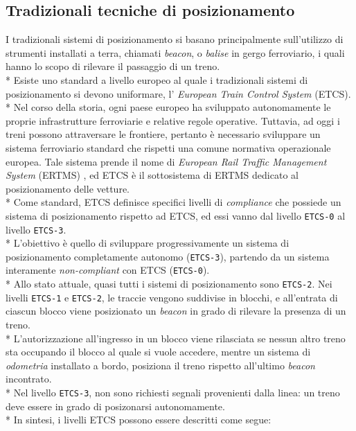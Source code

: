 \subsection{Tradizionali tecniche di posizionamento}
I tradizionali sistemi di posizionamento si basano principalmente sull'utilizzo di strumenti installati a terra, chiamati \emph{beacon}, o \emph{balise} in gergo ferroviario, i quali hanno lo scopo di rilevare il passaggio di un treno. \cite{tecnicheodierne}\\*
Esiste uno standard a livello europeo al quale i tradizionali sistemi di posizionamento si devono uniformare, l' \emph{European Train Control System} (ETCS).\\*
Nel corso della storia, ogni paese europeo ha sviluppato autonomamente le proprie infrastrutture ferroviarie e relative regole operative. Tuttavia, ad oggi i treni possono attraversare le frontiere, pertanto \`e necessario sviluppare un sistema ferroviario standard che rispetti una comune normativa operazionale europea. Tale sistema prende il nome di \emph{European Rail Traffic Management System} (ERTMS) \cite{ertms}, ed ETCS \`e il sottosistema di ERTMS dedicato al posizionamento delle vetture.\\*
Come standard, ETCS definisce specifici livelli di \emph{compliance} che possiede un sistema di posizionamento rispetto ad ETCS, ed essi vanno dal livello \texttt{ETCS-0} al livello \texttt{ETCS-3}.\\*
L'obiettivo \`e quello di sviluppare progressivamente un sistema di posizionamento completamente autonomo (\texttt{ETCS-3}), partendo da un sistema interamente \emph{non-compliant} con ETCS (\texttt{ETCS-0}).
\\*
Allo stato attuale, quasi tutti i sistemi di posizionamento sono \texttt{ETCS-2}. Nei livelli \texttt{ETCS-1} e \texttt{ETCS-2}, le traccie vengono suddivise in blocchi, e all'entrata di ciascun blocco viene posizionato un \emph{beacon} in grado di rilevare la presenza di un treno.\\*
L'autorizzazione all'ingresso in un blocco viene rilasciata se nessun altro treno sta occupando il blocco al quale si vuole accedere, mentre un sistema di \emph{odometria} installato a bordo, posiziona il treno rispetto all'ultimo \emph{beacon} incontrato.\\*
Nel livello \texttt{ETCS-3}, non sono richiesti segnali provenienti dalla linea: un treno deve essere in grado di posizonarsi autonomamente. \cite{etcs3}\\*
In sintesi, i livelli ETCS possono essere descritti come segue:
